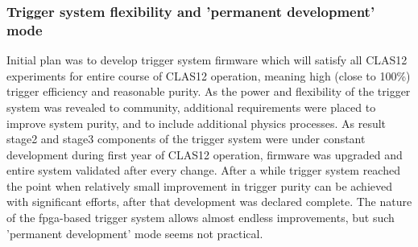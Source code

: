 \subsubsection{Trigger system flexibility and 'permanent development' mode}

Initial plan was to develop trigger system firmware which will satisfy all CLAS12 experiments for entire course of CLAS12 operation, meaning high (close to 100\%) trigger efficiency and reasonable purity. As the power and flexibility of the trigger system was revealed to community, additional requirements were placed to improve system purity, and to include additional physics processes. As result stage2 and stage3 components of the trigger system were under constant development during first year of CLAS12 operation, firmware was upgraded and entire system validated after every change. After a while trigger system reached the point when relatively small improvement in trigger purity can be achieved with significant efforts, after that development was declared complete. The nature of the fpga-based trigger system allows almost endless improvements, but such 'permanent development' mode seems not practical.
